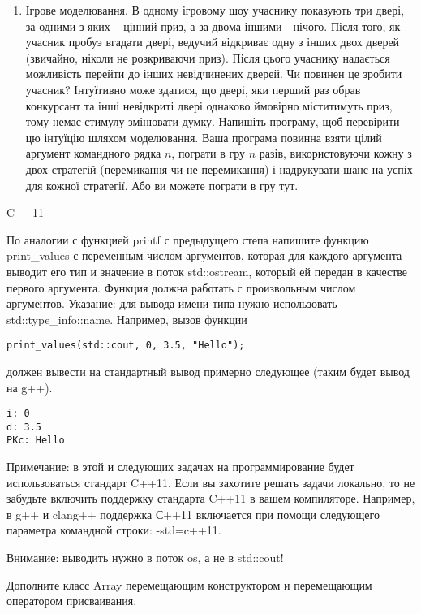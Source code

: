 \documentclass[]{article}
\begin{document}
\begin{enumerate}
\item Ігрове моделювання.
В одному ігровому шоу учаснику показують три двері, за одними з яких -- цінний приз, а за двома іншими - нічого.
Після того, як учасник пробуэ вгадати двері, ведучий відкриває одну з інших двох дверей (звичайно, ніколи не розкриваючи приз).
Після цього учаснику надається можливість перейти до інших невідчинених дверей.
Чи повинен це зробити учасник? Інтуїтивно може здатися, що двері, яки перший раз обрав конкурсант та інші невідкриті двері однаково ймовірно міститимуть приз, тому немає стимулу змінювати думку.
Напишіть програму, щоб перевірити цю інтуїцію шляхом моделювання.
 Ваша програма повинна взяти цілий аргумент командного рядка $n$, пограти в гру $n$ разів,
використовуючи кожну з двох стратегій (перемикання чи не перемикання) і надрукувати шанс на успіх для кожної стратегії.
Або ви можете пограти в гру тут.

\end{enumerate}


C++11

\def\labelenumi{\arabic{enumi}.}
\item

По аналогии с функцией printf с предыдущего степа напишите функцию print\_values с переменным числом аргументов, которая для каждого аргумента выводит его тип и значение в поток std::ostream, который ей передан в качестве первого аргумента. Функция должна работать с произвольным числом аргументов.
Указание: для вывода имени типа нужно использовать std::type\_info::name.
Например, вызов функции
\begin{verbatim}
print_values(std::cout, 0, 3.5, "Hello");
\end{verbatim}
должен вывести на стандартный вывод примерно следующее (таким будет вывод на g++).
\begin{verbatim}
i: 0
d: 3.5
PKc: Hello
\end{verbatim}

Примечание: в этой и следующих задачах на программирование будет использоваться стандарт C++11. Если вы захотите решать задачи локально, то не забудьте включить поддержку стандарта C++11 в вашем компиляторе. Например, в g++ и clang++ поддержка С++11 включается при помощи следующего параметра командной строки: -std=c++11.

Внимание: выводить нужно в поток os, а не в std::cout!


\item

Дополните класс Array перемещающим конструктором и перемещающим оператором присваивания.
\end{document}
